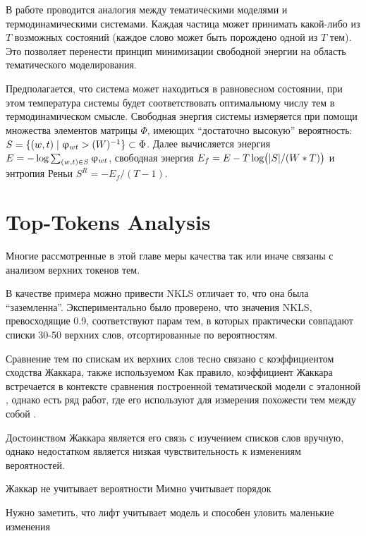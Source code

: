 В работе \cite{koltcov2018application} проводится аналогия между тематическими моделями и термодинамическими системами. Каждая частица может принимать какой-либо из $T$ возможных состояний (каждое слово может быть порождено одной из $T$ тем). Это позволяет перенести принцип минимизации свободной энергии на область тематического моделирования.

Предполагается, что система может находиться в равновесном состоянии, при этом температура системы будет соответствовать оптимальному числу тем в термодинамическом смысле. Свободная энергия системы измеряется при помощи множества элементов матрицы $\Phi$, имеющих ``достаточно высокую'' вероятность: $S \hm= \{(w, t) \hm\mid \phi_{wt} \hm> (W)^{-1} \} \hm\subset \Phi$. Далее вычисляется энергия $E \hm= -\log \sum_{(w,t) \in S} \phi_{wt}$, свободная энергия  $E_f \hm= E - T \log\bigl(|S| / (W * T)\bigr)$ и энтропия Реньи $S^R = -E_f / (T - 1)$.

\section{Top-Tokens Analysis}


Многие рассмотренные в этой главе меры качества так или иначе связаны с анализом верхних токенов тем.

В качестве примера можно привести NKLS отличает то, что она была ``заземленна''. Экспериментально было проверено, что значения NKLS, превосходящие 0.9, соответствуют парам тем, в которых практически совпадают списки 30-50 верхних слов, отсортированные по вероятностям.

Сравнение тем по спискам их верхних слов тесно связано с коэффициентом сходства Жаккара, также используемом  Как правило, коэффициент Жаккара встречается в контексте сравнения построенной тематической модели с эталонной \cite{} \cite{} \cite{}, однако есть ряд работ, где его используют для измерения похожести тем между собой \cite{bulatov}\cite{yanginferring}. 


Достоинством Жаккара является его связь с изучением списков слов вручную, однако недостатком является низкая чувствительность к изменениям вероятностей.

Жаккар не учитывает вероятности
Мимно учитывает порядок

Нужно заметить, что лифт учитывает модель и способен уловить маленькие изменения

